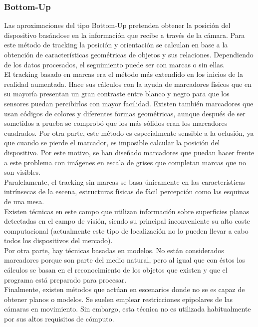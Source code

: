 \subsubsection{Bottom-Up}
Las aproximaciones del tipo Bottom-Up pretenden obtener la posición del dispositivo basándose en la información que recibe a través de la cámara.
Para este método de tracking la posición y orientación se calculan en base a la obtención de características geométricas de objetos y sus relaciones. Dependiendo de los datos procesados, el seguimiento puede ser con marcas o sin ellas.\\
El tracking basado en marcas era el método más extendido en los inicios de la realidad aumentada. Hace sus cálculos con la ayuda de marcadores físicos que en su mayoría presentan un gran contraste entre blanco y negro para que los sensores puedan percibirlos con mayor facilidad. Existen también marcadores que usan códigos de colores y diferentes formas geométricas, aunque después de ser sometidos a prueba se comprobó que los más sólidos eran los marcadores cuadrados. Por otra parte, este método es especialmente sensible a la oclusión, ya que cuando se pierde el marcador, es imposible calcular la posición del dispositivo. Por este motivo, se han diseñado marcadores que puedan hacer frente a este problema con imágenes en escala de grises que completan marcas que no son visibles.\\
Paralelamente, el tracking sin marcas se basa únicamente en las características intrínsecas de la escena, estructuras físicas de fácil percepción como las esquinas de una mesa.\\
Existen técnicas en este campo que utilizan información sobre superficies planas detectadas en el campo de visión, siendo su principal inconveniente su alto coste computacional (actualmente este tipo de localización no lo pueden llevar a cabo todos los dispositivos del mercado).\\
Por otra parte, hay técnicas basadas en modelos. No están considerados marcadores porque son parte del medio natural, pero al igual que con éstos los cálculos se basan en el reconocimiento de los objetos que existen y que el programa está preparado para procesar.\\
Finalmente, existen métodos que actúan en escenarios donde no se es capaz de obtener planos o modelos. Se suelen emplear restricciones epipolares de las cámaras en movimiento. Sin embargo, esta técnica no es utilizada habitualmente por sus altos requisitos de cómputo.\\
